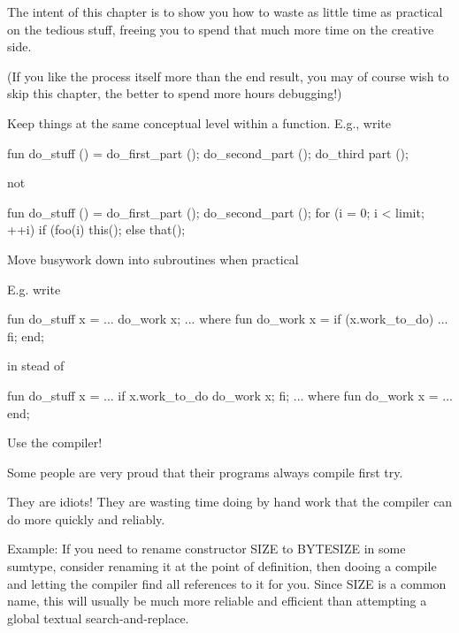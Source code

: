The intent of this chapter is to show you how to waste as little time 
as practical on the tedious stuff, freeing you to spend that much more 
time on the creative side.

(If you like the process itself more than the end result, you may of 
course wish to skip this chapter, the better to spend more hours debugging!)




Keep things at the same conceptual level within a function.
E.g., write

    fun do_stuff ()
        = 
        {    do_first_part  ();
             do_second_part ();
             do_third part  ();
        }

not

    fun do_stuff ()
        = 
        {    do_first_part  ();
             do_second_part ();
             for (i = 0; i < limit; ++i) { 
                 if (foo(i)   this(); 
                 else         that(); 
             } 
        } 



Move busywork down into subroutines when practical 

E.g. write 

     fun do_stuff x 
         = 
         { 
             ... 
             do_work x; 
             ... 
         } 
         where 
             fun do_work x 
                 = 
                 if (x.work_to_do) 
                     ... 
                 fi; 
         end; 

in stead of 

     fun do_stuff x 
         = 
         { 
             ... 
             if x.work_to_do   do_work x;       fi; 
             ... 
         }  
         where 
             fun do_work x 
                 = 
                 ... 
         end; 

          


Use the compiler!

Some people are very proud that their programs always compile first try.

They are idiots!  They are wasting time doing by hand work that the 
compiler can do more quickly and reliably. 

Example: If you need to rename constructor SIZE to BYTESIZE in 
some sumtype, consider renaming it at the point of definition, then 
dooing a compile and letting the compiler find all references to it 
for you.  Since SIZE is a common name, this will usually be much more 
reliable and efficient than attempting a global textual 
search-and-replace.


